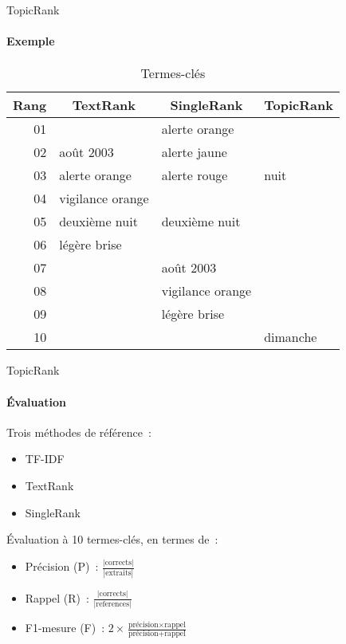 \begin{frame}{TopicRank}\framesubtitle{Exemple}
  \begin{table}
    \centering
    \begin{tabular}{r|l|l|l}
      \toprule
      \textbf{Rang} & \multicolumn{1}{c|}{\textbf{TextRank}} &
      \multicolumn{1}{c|}{\textbf{SingleRank}} & \multicolumn{1}{c}{\textbf{TopicRank}} \\
      \hline
      01 & \cellcolor{termithorange!30}{août 2012} & alerte orange & \cellcolor{termithorange!30}{Luxembourg}\\
      02 & août 2003 & alerte jaune & \cellcolor{termithorange!30}{alerte} \\
      03 & alerte orange & alerte rouge & nuit \\
      04 & vigilance orange & \cellcolor{termithorange!30}{alerte} & \cellcolor{termithorange!30}{Belgique} \\
      05 & deuxième nuit & deuxième nuit & \cellcolor{termithorange!30}{août 2012}\\
      06 & légère brise & \cellcolor{termithorange!30}{août 2012} & \cellcolor{termithorange!30}{chaleur} \\
      07 & & août 2003 & \cellcolor{termithorange!30}{température} \\
      08 & & vigilance orange & \cellcolor{termithorange!30}{chaude} \\
      09 & & légère brise & \cellcolor{termithorange!30}{canicule} \\
      10 & & \cellcolor{termithorange!30}{Luxembourg} & dimanche \\
      \bottomrule
    \end{tabular}

    \caption{Termes-clés}
  \end{table}
\end{frame}

\begin{frame}{TopicRank}\framesubtitle{Évaluation}
  Trois méthodes de référence~:
  \begin{itemize}
    \item{TF-IDF~\cite{salton1975tfidf}}
    \item{TextRank~\cite{mihalcea2004textrank}}
    \item{SingleRank~\cite{wan2008expandrank}}
  \end{itemize}

  \vspace{1em}

  Évaluation à 10 termes-clés, en termes de~:
  \begin{itemize}
    \item{Précision (P)~: $\frac{|\text{corrects}|}{|\text{extraits}|}$}
    \item{Rappel (R)~: $\frac{|\text{corrects}|}{|\text{references}|}$}
    \item{F1-mesure (F)~: $2 \times \frac{\text{précision} \times \text{rappel}}{\text{précision} + \text{rappel}}$}
  \end{itemize}
\end{frame}

